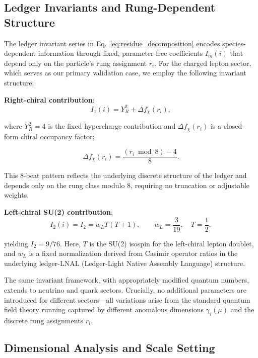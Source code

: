 \documentclass[%
amsmath,amssymb,
aps,
prb,
floatfix,
twocolumn
]{revtex4-2}
\begin{document}
\subsection{Ledger Invariants and Rung-Dependent Structure}
\label{subsec:ledger-invariants}

The ledger invariant series in Eq.~\eqref{eq:residue_decomposition} encodes species-dependent information through fixed, parameter-free coefficients $I_m(i)$ that depend only on the particle's rung assignment $r_i$. For the charged lepton sector, which serves as our primary validation case, we employ the following invariant structure:

\textbf{Right-chiral contribution}:
\begin{equation}
I_1(i) = Y_R^2 + \Delta f_\chi(r_i),
\label{eq:I1_invariant}
\end{equation}

where $Y_R^2 = 4$ is the fixed hypercharge contribution and $\Delta f_\chi(r_i)$ is a closed-form chiral occupancy factor:

\begin{equation}
\Delta f_\chi(r_i) = \frac{(r_i \bmod 8) - 4}{8}.
\label{eq:chiral_occupancy}
\end{equation}

This 8-beat pattern reflects the underlying discrete structure of the ledger and depends only on the rung class modulo 8, requiring no truncation or adjustable weights.

\textbf{Left-chiral SU(2) contribution}:
\begin{equation}
I_2(i) = I_2 = w_L T(T+1), \qquad w_L = \frac{3}{19}, \quad T = \frac{1}{2},
\label{eq:I2_invariant}
\end{equation}

yielding $I_2 = 9/76$. Here, $T$ is the SU(2) isospin for the left-chiral lepton doublet, and $w_L$ is a fixed normalization derived from Casimir operator ratios in the underlying ledger-LNAL (Ledger-Light Native Assembly Language) structure.

The same invariant framework, with appropriately modified quantum numbers, extends to neutrino and quark sectors. Crucially, no additional parameters are introduced for different sectors—all variations arise from the standard quantum field theory running captured by different anomalous dimensions $\gamma_i(\mu)$ and the discrete rung assignments $r_i$.

\subsection{Dimensional Analysis and Scale Setting}
\end{document}
